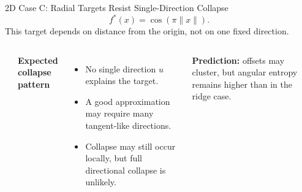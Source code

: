 \documentclass[aspectratio=169,10pt]{beamer}
\begin{document}
\begin{frame}{2D Case C: Radial Targets Resist Single-Direction Collapse}
\small
\[
f^\ast(x)=\cos(\pi\|x\|).
\]
\vspace{-0.25cm}
This target depends on distance from the origin, not on one fixed direction.

\begin{columns}[T,onlytextwidth]
\begin{center}
\end{center}

\textbf{\textcolor{rtgnavy}{Expected collapse pattern}}
\begin{itemize}
  \item No single direction $u$ explains the target.
  \item A good approximation may require many tangent-like directions.
  \item Collapse may still occur locally, but full directional collapse is unlikely.
\end{itemize}

\vspace{0.08cm}
\begin{tcolorbox}[slideboxC]
\centering\textbf{Prediction:} offsets may cluster, but angular entropy remains higher than in the ridge case.
\end{tcolorbox}
\end{columns}
\end{frame}
\end{document}
